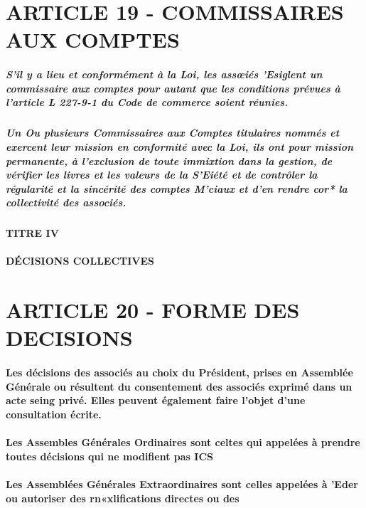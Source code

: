 \documentclass[a4paper, 11pt]{article}
\begin{document}
\section*{ARTICLE 19 - COMMISSAIRES AUX COMPTES}

\subparagraph{
  S'il y a lieu et conformément à la Loi, les assœiés 'Esiglent un commissaire aux comptes pour autant que les conditions prévues à l'article L 227-9-1 du Code de commerce soient réunies.
}

\subparagraph{
  Un Ou plusieurs Commissaires aux Comptes titulaires nommés et exercent leur mission en conformité avec la Loi, ils ont pour mission permanente, à l'exclusion de toute immixtion dans la gestion, de vérifier les livres et les valeurs de la S'Eiété et de contrôler la régularité et la sincérité des comptes M'ciaux et d'en rendre cor* la collectivité des associés.
}

\paragraph{
  TITRE IV\\
  \\
  DÉCISIONS COLLECTIVES
}

\section*{ARTICLE 20 - FORME DES DECISIONS}

\paragraph{
  Les décisions des associés au choix du Président, prises en Assemblée Générale ou résultent du consentement des associés exprimé dans un acte seing privé. Elles peuvent également faire l'objet d'une consultation écrite.
}

\paragraph{
  Les Assembles Générales Ordinaires sont celtes qui appelées à prendre toutes décisions qui ne modifient pas ICS
}

\paragraph{
  Les Assemblées Générales Extraordinaires sont celles appelées à 'Eder ou autoriser des rn«xlifications directes ou des
}
\end{document}
